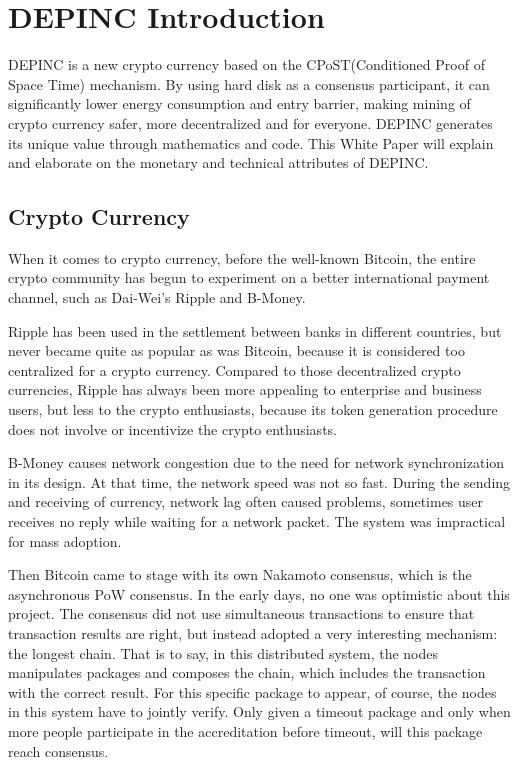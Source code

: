 \chapter{DEPINC Introduction}
DEPINC is a new crypto currency based on the CPoST(Conditioned Proof of Space Time) mechanism. By using hard disk as a consensus participant, it can significantly lower energy consumption and entry barrier, making mining of crypto currency safer, more decentralized and for everyone. DEPINC generates its unique value through mathematics and code. This White Paper will explain and elaborate on the monetary and technical attributes of DEPINC.
\section{Crypto Currency}
\begin{flushleft}
    When it comes to crypto currency, before the well-known Bitcoin, the entire crypto community has begun to experiment on a better international payment channel, such as Dai-Wei's Ripple and B-Money.
\end{flushleft}
\begin{flushleft}
    Ripple has been used in the settlement between banks in different countries, but never became quite as popular as was Bitcoin, because it is considered too centralized for a crypto currency. Compared to those decentralized crypto currencies, Ripple has always been more appealing to enterprise and business users, but less to the crypto enthusiasts, because its token generation procedure does not involve or incentivize the crypto enthusiasts.
\end{flushleft}
\begin{flushleft}
    B-Money causes network congestion due to the need for network synchronization in its design. At that time, the network speed was not so fast. During the sending and receiving of currency, network lag often caused problems, sometimes user receives no reply while waiting for a network packet. The system was impractical for mass adoption.
\end{flushleft}
\begin{flushleft}
    Then Bitcoin came to stage with its own Nakamoto consensus, which is the asynchronous PoW consensus. In the early days, no one was optimistic about this project. The consensus did not use simultaneous transactions to ensure that transaction results are right, but instead adopted a very interesting mechanism: the longest chain. That is to say, in this distributed system, the nodes manipulates packages and composes the chain, which includes the transaction with the correct result. For this specific package to appear, of course, the nodes in this system have to jointly verify. Only given a timeout package and only when more people participate in the accreditation before timeout, will this package reach consensus.
\end{flushleft}
